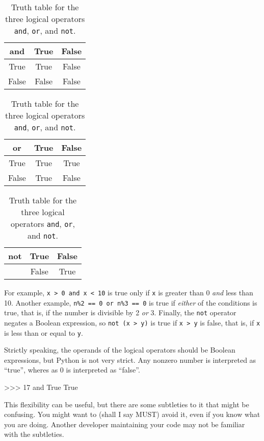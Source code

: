 \begin{table}[htb]
\begin{center}
\begin{minipage}[t]{.3\textwidth}
\begin{tabular}{|c|cc|}
\hline
and   & True  & False \\\hline
True  & True  & False \\
False & False & False \\\hline
\end{tabular}
\end{minipage}
%
\begin{minipage}[t]{.3\textwidth}
\begin{tabular}{|c|cc|}
\hline
or    & True  & False \\\hline
True  & True  & True  \\
False & True  & False \\\hline
\end{tabular}
\end{minipage}
%
\begin{minipage}[t]{.3\textwidth}
\begin{tabular}{|c|cc|}
\hline
not  & True  & False\\\hline
     & False & True \\\hline
\end{tabular}
\end{minipage}
%
\caption{Truth table for the three logical operators {\tt and}, {\tt or}, and {\tt not}.}
\label{tab:truth_table}
\end{center}
\end{table}

%

%
 For example, {\tt x > 0 and x < 10} is true only if {\tt x} is greater than 0
{\em and} less than 10. Another example, {\tt n\%2 == 0 or n\%3 == 0} is true if {\em either} of the conditions
is true, that is, if the number is divisible by 2 {\em or} 3.
%
Finally, the {\tt not} operator negates a Boolean
expression, so {\tt not (x > y)} is true if {\tt x > y} is false,
that is, if {\tt x} is less than or equal to {\tt y}.

\begin{remark}
Strictly speaking, the operands of the logical operators should be
Boolean expressions, but Python is not very strict.
Any nonzero number is interpreted as ``true'', wheres as 0 is interpreted as ``false''.

\beforeverb
\begin{pycode}
>>> 17 and True
True
\end{pycode}
\afterverb
%
This flexibility can be useful, but there are some subtleties to
it that might be confusing.  You might want to (shall I say MUST) avoid it, even if
you know what you are doing. Another developer maintaining your code may not be familiar with the subtleties.

\end{remark}


